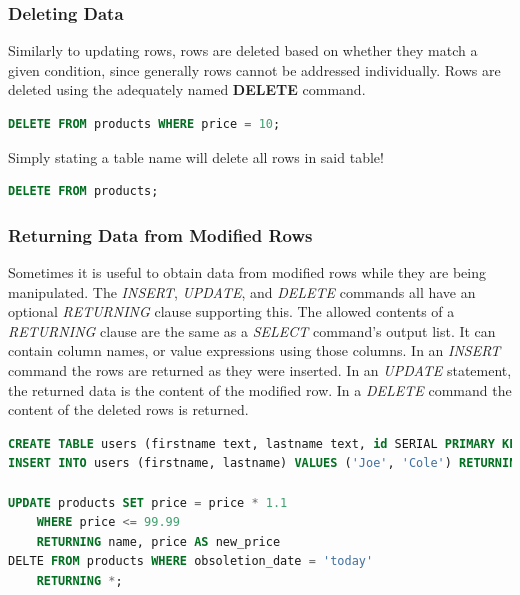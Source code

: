 \subsubsection{Deleting Data}
Similarly to updating rows, rows are deleted based on whether they match a given condition, since generally rows cannot be addressed individually. Rows are deleted using the adequately named \textbf{DELETE} command.
\begin{lstlisting}[language=SQL]
DELETE FROM products WHERE price = 10;
\end{lstlisting}
Simply stating a table name will delete all rows in said table!
\begin{lstlisting}[language=SQL]
DELETE FROM products;
\end{lstlisting}

\subsubsection{Returning Data from Modified Rows}
Sometimes it is useful to obtain data from modified rows while they are being manipulated. The \textit{INSERT}, \textit{UPDATE}, and \textit{DELETE} commands all have an optional \textit{RETURNING} clause supporting this. The allowed contents of a \textit{RETURNING} clause are the same as a \textit{SELECT} command's output list. It can contain column names, or value expressions using those columns. In an \textit{INSERT} command the rows are returned as they were inserted. In an \textit{UPDATE} statement, the returned data is the content of the modified row. In a \textit{DELETE} command the content of the deleted rows is returned.
\begin{lstlisting}[language=SQL]
CREATE TABLE users (firstname text, lastname text, id SERIAL PRIMARY KEY);
INSERT INTO users (firstname, lastname) VALUES ('Joe', 'Cole') RETURNING id;

UPDATE products SET price = price * 1.1
	WHERE price <= 99.99
	RETURNING name, price AS new_price
DELTE FROM products WHERE obsoletion_date = 'today'
	RETURNING *;	
\end{lstlisting}

